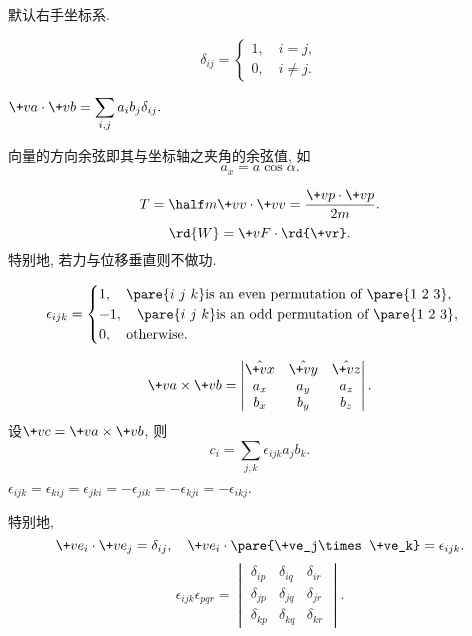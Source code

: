 \documentclass[../LectureNotes.tex]{subfiles}
\begin{document}
默认右手坐标系.
\begin{definition}
    \[ \delta_{ij} = \begin{cases}
        1,\quad i=j,\\
        0,\quad i\neq j.
    \end{cases} \]
\end{definition}
\begin{ex}
    \hfill $\displaystyle \+va\cdot\+vb = \sum_{i,j} a_ib_j\delta_{ij}.$ \hfill\mbox{}
\end{ex}
\begin{definition}
    向量的方向余弦即其与坐标轴之夹角的余弦值, 如
    \[ a_x = a\cos\alpha. \]
\end{definition}
\begin{ex}[动能与功的表示]
    \[ T = \half m\+vv\cdot\+vv = \frac{\+vp\cdot\+vp}{2m}. \]
    \[ \rd{W} = \+vF\cdot\rd{\+vr}. \]
    特别地, 若力与位移垂直则不做功.
\end{ex}
\begin{definition}
    \[ \epsilon_{ijk} = \begin{cases}
        1,\quad \pare{i\ j\ k}\text{is an even permutation of } \pare{1\ 2\ 3},\\
        -1,\quad \pare{i\ j\ k}\text{is an odd permutation of } \pare{1\ 2\ 3},\\
        0,\quad \text{otherwise}.
    \end{cases} \]
\end{definition}
\begin{theorem}[叉乘的分量表示]
    \[ \+va\times\+vb = \begin{vmatrix}
        \hat{\+vx} & \hat{\+vy} & \hat{\+vz} \\
        a_x & a_y & a_z \\
        b_x & b_y & b_z
    \end{vmatrix}. \]
    设$\+vc = \+va\times\+vb$, 则
    \[ c_i = \sum_{j,k} \epsilon_{ijk}a_jb_k. \]
\end{theorem}
\begin{ex}
    \hfill $\epsilon_{ijk} = \epsilon_{kij} = \epsilon_{jki} = -\epsilon_{jik} = -\epsilon_{kji} = -\epsilon_{ikj}.$ \hfill\mbox{}
\end{ex}
特别地,
\[ \+ve_i \cdot \+ve_j = \delta_{ij}, \quad \+ve_{i}\cdot\pare{\+ve_j\times \+ve_k} = \epsilon_{ijk}. \]
\[ \epsilon_{ijk}\epsilon_{pqr} = \begin{vmatrix}
    \delta_{ip} & \delta_{iq} & \delta_{ir} \\
    \delta_{jp} & \delta_{jq} & \delta_{jr} \\
    \delta_{kp} & \delta_{kq} & \delta_{kr}
\end{vmatrix}. \]
\end{document}
